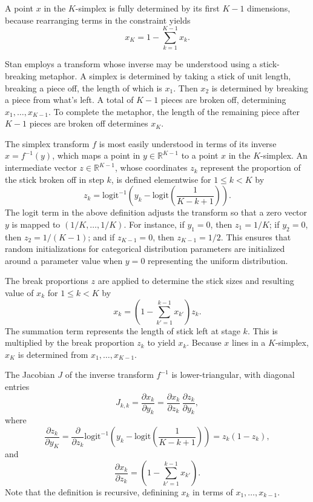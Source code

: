 \documentclass[10pt]{report}
\begin{document}
A point $x$ in the $K$-simplex is fully determined by its first $K-1$
dimensions, because rearranging terms in the constraint yields
%
\[
x_K = 1 - \sum_{k=1}^{K-1} x_k.
\]
%

Stan employs a transform whose inverse may be understood using a
stick-breaking metaphor.  A simplex is determined by taking a stick of
unit length, breaking a piece off, the length of which is $x_1$.  Then
$x_2$ is determined by breaking a piece from what's left.  A total of
$K-1$ pieces are broken off, determining $x_1,\ldots,x_{K-1}$.  To
complete the metaphor, the length of the remaining piece after $K-1$
pieces are broken off determines $x_K$.

The simplex transform $f$ is most easily understood in terms of its
inverse $x = f^{-1}(y)$, which maps a point in $y \in
\mathbb{R}^{K-1}$ to a point $x$ in the $K$-simplex.  An intermediate
vector $z \in \mathbb{R}^{K-1}$, whose coordinates $z_k$ represent 
the proportion of the stick broken off in step $k$, is defined
elementwise for $1 \leq k < K$ by
%
\[
z_k = \mbox{logit}^{-1} \left( y_k 
                             - \mbox{logit} \left( \frac{1}{K - k + 1}
                                            \right)
                       \right).
\]
%
The logit term in the above definition adjusts the transform so that a
zero vector $y$ is mapped to $(1/K,\ldots,1/K)$.  For instance, if
$y_1 = 0$, then $z_1 = 1/K$; if $y_2 = 0$, then $z_2 = 1/(K-1)$; and
if $z_{K-1} = 0$, then $z_{K-1} = 1/2$.  This ensures that random
initializations for categorical distribution parameters are
initialized around a parameter value when $y = 0$ representing the
uniform distribution.

The break proportions $z$ are applied to determine the stick sizes and
resulting value of $x_k$ for $1 \leq k < K$ by
%
\[
x_k = 
\left( 1 - \sum_{k'=1}^{k-1} x_{k'} \right) z_k.
\]
%
The summation term represents the length of stick left at stage $k$.
This is multiplied by the break proportion $z_k$ to yield $x_k$.
Because $x$ lines in a $K$-simplex, $x_K$ is determined from
$x_1,\ldots,x_{K-1}$.

The Jacobian $J$ of the inverse transform $f^{-1}$ is
lower-triangular, with diagonal entries
\[
J_{k,k}
=
\frac{\partial x_k}{\partial y_k}
=
\frac{\partial x_k}{\partial z_k} \,
\frac{\partial z_k}{\partial y_k},
\]
%
where
\[
\frac{\partial z_k}{\partial y_K} 
= \frac{\partial}{\partial z_k} 
   \mbox{logit}^{-1} \left(
                       y_k - \mbox{logit} \left( \frac{1}{K-k+1}
                                          \right)
                    \right)
= z_k (1 - z_k),
\]
%
and
%
\[
\frac{\partial x_k}{\partial z_k}
=
\left( 
  1 - \sum_{k' = 1}^{k-1} x_{k'}
   \right)
.
\]
%
Note that the definition is recursive, definining $x_k$ in terms of
$x_{1},\ldots,x_{k-1}$.
\end{document}
